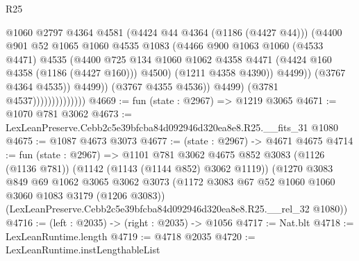 \begin{lexlean}{R25}
\begin{coremodule}
                                          @1060
                                          @2797
                                          @4364
                                          @4581
                                          (@4424 @44 @4364 (@1186 (@4427 @44)))
                                          (@4400
                                            @901
                                            @52
                                            @1065
                                            @1060
                                            @4535
                                            @1083
                                            (@4466
                                              @900
                                              @1063
                                              @1060
                                              (@4533 @4471)
                                              @4535
                                              (@4400
                                                @725
                                                @134
                                                @1060
                                                @1062
                                                @4358
                                                @4471
                                                (@4424 @160 @4358 (@1186 (@4427 @160)))
                                                @4500)
                                              (@1211 @4358 @4390))
                                            @4499))
                                        (@3767 @4364 @4535))
                                      @4499))
                                  (@3767 @4355 @4536))
                                @4499)
                              (@3781 @4537))))))))))))))
@4669 := fun (state : @2967) => @1219 @3065
@4671 := @1070 @781 @3062
@4673 := LexLeanPreserve.Cebb2c5e39bfcba84d092946d320ea8e8.R25.__fits_31 @1080
@4675 := @1087 @4673 @3073
@4677 := (state : @2967) -> @4671 @4675
@4714 := fun (state : @2967) =>
  @1101
    @781
    @3062
    @4675
    @852
    @3083
    (@1126 (@1136 @781))
    (@1142 (@1143 (@1144 @852) @3062 @1119))
    (@1270
      @3083
      @849
      @69
      @1062
      @3065
      @3062
      @3073
      (@1172 @3083 @67 @52 @1060 @1060 @3060 @1083 @3179 (@1206 @3083))
      (LexLeanPreserve.Cebb2c5e39bfcba84d092946d320ea8e8.R25.__rel_32 @1080))
@4716 := (left : @2035) -> (right : @2035) -> @1056
@4717 := Nat.blt
@4718 := LexLeanRuntime.length
@4719 := @4718 @2035
@4720 := LexLeanRuntime.instLengthableList

\end{coremodule}
\end{lexlean}
